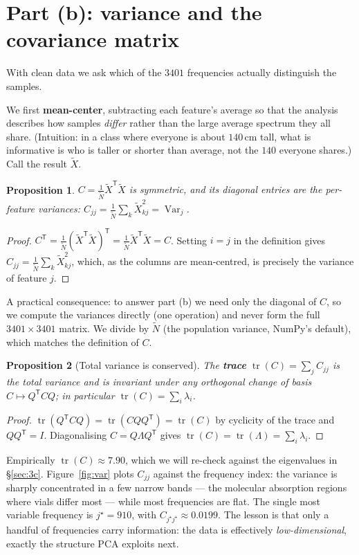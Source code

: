 \documentclass[11pt]{article}
\DeclareMathOperator{\tr}{tr}
\DeclareMathOperator{\Var}{Var}
\newcommand{\Xt}{\widetilde{X}}
\newcommand{\Nt}{\widetilde{N}}
\newcommand{\T}{^{\mathsf{T}}}
\theoremstyle{definition}\newtheorem{definition}{Definition}[section]
\theoremstyle{plain}\newtheorem{proposition}{Proposition}[section]
\theoremstyle{remark}\newtheorem{remark}{Remark}[section]
\begin{document}
\section{Part (b): variance and the covariance matrix}\label{sec:3b}
With clean data we ask which of the $3401$ frequencies actually distinguish the samples.

We first \textbf{mean-center}, subtracting each feature's average so that the analysis describes
how samples \emph{differ} rather than the large average spectrum they all share. (Intuition:
in a class where everyone is about $140$\,cm tall, what is informative is who is taller or
shorter than average, not the $140$ everyone shares.) Call the result $\Xt$.

\begin{proposition}\label{prop:diag}
$C=\tfrac1{\Nt}\Xt\T\Xt$ is symmetric, and its diagonal entries are the per-feature variances:
$C_{jj}=\tfrac1{\Nt}\sum_k\Xt_{kj}^2=\Var_j$.
\end{proposition}
\begin{proof}
$C\T=\tfrac1{\Nt}(\Xt\T\Xt)\T=\tfrac1{\Nt}\Xt\T\Xt=C$. Setting $i=j$ in the definition gives
$C_{jj}=\tfrac1{\Nt}\sum_k\Xt_{kj}^2$, which, as the columns are mean-centred, is precisely the
variance of feature $j$.
\end{proof}

A practical consequence: to answer part (b) we need only the diagonal of $C$, so we compute the
variances directly (one operation) and never form the full $3401\times3401$ matrix. We divide
by $\Nt$ (the population variance, NumPy's default), which matches the definition of $C$.

\begin{proposition}[Total variance is conserved]\label{prop:trace}
The \textbf{trace} $\tr(C)=\sum_jC_{jj}$ is the total variance and is invariant under any
orthogonal change of basis $C\mapsto Q\T C Q$; in particular $\tr(C)=\sum_i\lambda_i$.
\end{proposition}
\begin{proof}
$\tr(Q\T C Q)=\tr(CQQ\T)=\tr(C)$ by cyclicity of the trace and $QQ\T=I$. Diagonalising
$C=Q\Lambda Q\T$ gives $\tr(C)=\tr(\Lambda)=\sum_i\lambda_i$.
\end{proof}

Empirically $\tr(C)\approx7.90$, which we will re-check against the eigenvalues in
\S\ref{sec:3c}. Figure~\ref{fig:var} plots $C_{jj}$ against the frequency index: the variance is
sharply concentrated in a few narrow bands --- the molecular absorption regions where vials
differ most --- while most frequencies are flat. The single most variable frequency is
$j^\star=910$, with $C_{j^\star j^\star}\approx0.0199$. The lesson is that only a handful of
frequencies carry information: the data is effectively \emph{low-dimensional}, exactly the
structure PCA exploits next.
\end{document}
